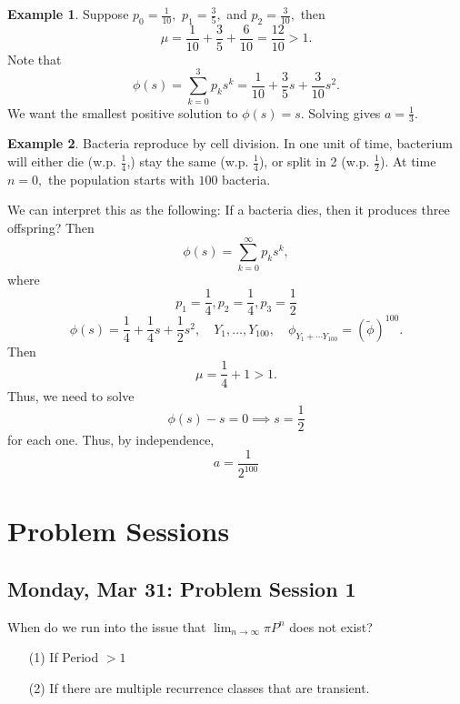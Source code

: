 \documentclass[10pt, oneside]{article}
\theoremstyle{definition}
\newtheorem{exmp}{Example}[section]
\begin{document}
\begin{exmp}
    Suppose $p_0 = \frac{1}{10},$ $p_1 = \frac{3}{5},$ and $p_2 = \frac{3}{10},$ then 
    \[\mu = \frac{1}{10} + \frac{3}{5} + \frac{6}{10} = \frac{12}{10} >1.\] Note that 
    \[\phi(s) = \sum_{k=0}^3 p_ks^k = \frac{1}{10} + \frac{3}{5}s + \frac{3}{10}s^2.\] We want the smallest positive solution to $\phi(s) = s.$ Solving gives $ a = \frac{1}{3}. $
\end{exmp}

\begin{exmp}
    Bacteria reproduce by cell division. In one unit of time, bacterium will either die (w.p. $\frac{1}{4}$,) stay the same (w.p. $\frac{1}{4}$), or split in 2 (w.p. $\frac{1}{2}$). At time $n = 0,$ the population starts with $100$ bacteria. 

    We can interpret this as the following: If a bacteria dies, then it produces three offspring?
    Then 
    \[\phi(s) = \sum_{k = 0}^\infty p_k s^k,\] where 
    \[p_1 = \frac{1}{4}, p_2  = \frac{1}{4}, p_3 = \frac{1}{2}\]
    \[\phi(s)= \frac{1}{4} + \frac{1}{4}s + \frac{1}{2} s^2, \quad Y_1, \dots, Y_{100}, \quad \phi_{Y_1 + \cdots Y_{100}} = (\tilde{\phi})^{100}.\] Then 
    \[\mu = \frac{1}{4} + 1 >1.\] Thus, we need to solve 
    \[\phi(s) - s = 0 \implies s = \frac{1}{2}\] for each one. Thus, by independence,
    \[ a = \frac{1}{2^{100}}\]
\end{exmp}









\newpage
\section{Problem Sessions}
\subsection{Monday, Mar 31: Problem Session 1}
When do we run into the issue that $\lim_{n\to \infty}\pi P^n$ does not exist? 
\begin{enumerate}
    \item[(1)] If Period $> 1$
    \item[(2)] If there are multiple recurrence classes that are transient.
\end{enumerate}
\end{document}
